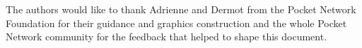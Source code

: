 \documentclass[conference,compsoc]{IEEEtran}
\begin{document}
The authors would like to thank Adrienne and Dermot from the Pocket Network Foundation for their guidance and graphics construction and the whole Pocket Network community for the feedback that helped to shape this document.









%






\end{document}
